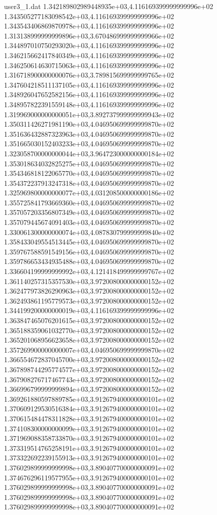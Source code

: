\begin{filecontents}{user3_1.dat}
1.342189802989448935e+03,4.116169399999999996e+02
1.343505277183098542e+03,4.116169399999999996e+02
1.343543406869870978e+03,4.116169399999999996e+02
1.313138999999999896e+03,3.670486999999999966e+02
1.344897010750293020e+03,4.116169399999999996e+02
1.346215662417840349e+03,4.116169399999999996e+02
1.346250614630715063e+03,4.116169399999999996e+02
1.316718900000000076e+03,3.789815699999999765e+02
1.347604218511137105e+03,4.116169399999999996e+02
1.348926047652582156e+03,4.116169399999999996e+02
1.348957822391559148e+03,4.116169399999999996e+02
1.319969000000000051e+03,3.892737999999999943e+02
1.350311426271981190e+03,4.046950699999999870e+02
1.351636432887323963e+03,4.046950699999999870e+02
1.351665030152403233e+03,4.046950699999999870e+02
1.323058700000000044e+03,3.964723000000000184e+02
1.353018634032825275e+03,4.046950699999999870e+02
1.354346818122065770e+03,4.046950699999999870e+02
1.354372237913247318e+03,4.046950699999999870e+02
1.325969800000000077e+03,4.031208500000000186e+02
1.355725841793669360e+03,4.046950699999999870e+02
1.357057203356807349e+03,4.046950699999999870e+02
1.357079445674091403e+03,4.046950699999999870e+02
1.330061300000000074e+03,4.087830799999999840e+02
1.358433049554513445e+03,4.046950699999999870e+02
1.359767588591549156e+03,4.046950699999999870e+02
1.359786653434935488e+03,4.046950699999999870e+02
1.336604199999999992e+03,4.121418499999999767e+02
1.361140257315357530e+03,3.972008000000000152e+02
1.362477973826290963e+03,3.972008000000000152e+02
1.362493861195779573e+03,3.972008000000000152e+02
1.344199200000000019e+03,4.116169399999999996e+02
1.363847465076201615e+03,3.972008000000000152e+02
1.365188359061032770e+03,3.972008000000000152e+02
1.365201068956623658e+03,3.972008000000000152e+02
1.357269900000000007e+03,4.046950699999999870e+02
1.366554672837045700e+03,3.972008000000000152e+02
1.367898744295774577e+03,3.972008000000000152e+02
1.367908276717467743e+03,3.972008000000000152e+02
1.366996799999999894e+03,3.972008000000000152e+02
1.369261880597889785e+03,3.912679400000000101e+02
1.370609129530516384e+03,3.912679400000000101e+02
1.370615484478311828e+03,3.912679400000000101e+02
1.374108300000000099e+03,3.912679400000000101e+02
1.371969088358733870e+03,3.912679400000000101e+02
1.373319514765258191e+03,3.912679400000000101e+02
1.373322692239155913e+03,3.912679400000000101e+02
1.376029899999999998e+03,3.890407700000000091e+02
1.374676296119577955e+03,3.912679400000000101e+02
1.376029899999999998e+03,3.890407700000000091e+02
1.376029899999999998e+03,3.890407700000000091e+02
1.376029899999999998e+03,3.890407700000000091e+02
\end{filecontents}